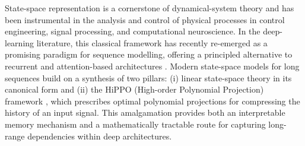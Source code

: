 \documentclass{article}
\theoremstyle{definition}
\begin{document}





State-space representation is a cornerstone of dynamical-system theory and has been instrumental in the analysis and control of physical processes in control engineering, signal processing, and computational neuroscience. In the deep-learning literature, this classical framework has recently re-emerged as a promising paradigm for sequence modelling, offering a principled alternative to recurrent and attention-based architectures \citep{gu_efficiently_2022, dao2024transformers, zhu2024vision, nguyen2022s4nd, goel_its_2022}.
Modern state-space models for long sequences build on a synthesis of two pillars: (i) linear state-space theory in its canonical form \citep{williams2007linear, zak2003systems} and (ii) the HiPPO (High-order Polynomial Projection) framework \citep{gu2020hippo}, which prescribes optimal polynomial projections for compressing the history of an input signal. This amalgamation provides both an interpretable memory mechanism and a mathematically tractable route for capturing long-range dependencies within deep architectures.
\end{document}

